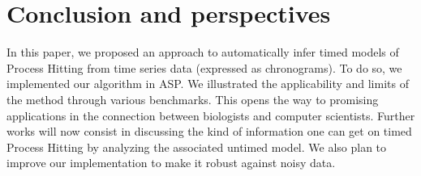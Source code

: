 \section{Conclusion and perspectives}
\label{sec:conclusion}

In this paper, we proposed an approach to automatically infer timed models of Process Hitting from time series data (expressed as chronograms). To do so, we implemented our algorithm in ASP. We illustrated the applicability and limits of the method through various benchmarks. This opens the way to promising applications in the connection between biologists and computer scientists. Further works will now consist in discussing the kind of information one can get on timed Process Hitting by analyzing the associated untimed model. We also plan to improve our implementation to make it robust against noisy data.  



